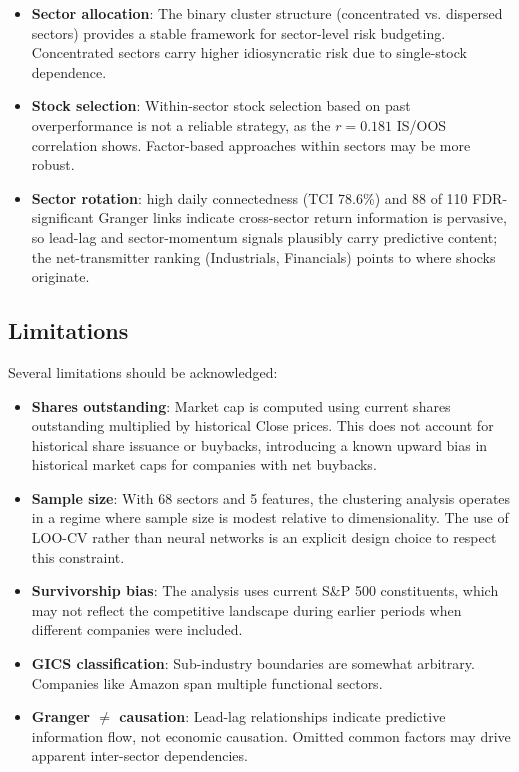 \documentclass[11pt]{article}
\begin{document}
\begin{itemize}
    \item \textbf{Sector allocation}: The binary cluster structure (concentrated vs. dispersed sectors) provides a stable framework for sector-level risk budgeting. Concentrated sectors carry higher idiosyncratic risk due to single-stock dependence.
    \item \textbf{Stock selection}: Within-sector stock selection based on past overperformance is not a reliable strategy, as the $r = 0.181$ IS/OOS correlation shows. Factor-based approaches within sectors may be more robust.
    \item \textbf{Sector rotation}: high daily connectedness (TCI 78.6\%) and 88 of 110 FDR-significant Granger links indicate cross-sector return information is pervasive, so lead-lag and sector-momentum signals plausibly carry predictive content; the net-transmitter ranking (Industrials, Financials) points to where shocks originate.
\end{itemize}

\subsection{Limitations}

Several limitations should be acknowledged:

\begin{itemize}
    \item \textbf{Shares outstanding}: Market cap is computed using current shares outstanding multiplied by historical Close prices. This does not account for historical share issuance or buybacks, introducing a known upward bias in historical market caps for companies with net buybacks.
    \item \textbf{Sample size}: With 68 sectors and 5 features, the clustering analysis operates in a regime where sample size is modest relative to dimensionality. The use of LOO-CV rather than neural networks is an explicit design choice to respect this constraint.
    \item \textbf{Survivorship bias}: The analysis uses current S\&P 500 constituents, which may not reflect the competitive landscape during earlier periods when different companies were included.
    \item \textbf{GICS classification}: Sub-industry boundaries are somewhat arbitrary. Companies like Amazon span multiple functional sectors.
    \item \textbf{Granger $\neq$ causation}: Lead-lag relationships indicate predictive information flow, not economic causation. Omitted common factors may drive apparent inter-sector dependencies.
\end{itemize}
\end{document}
